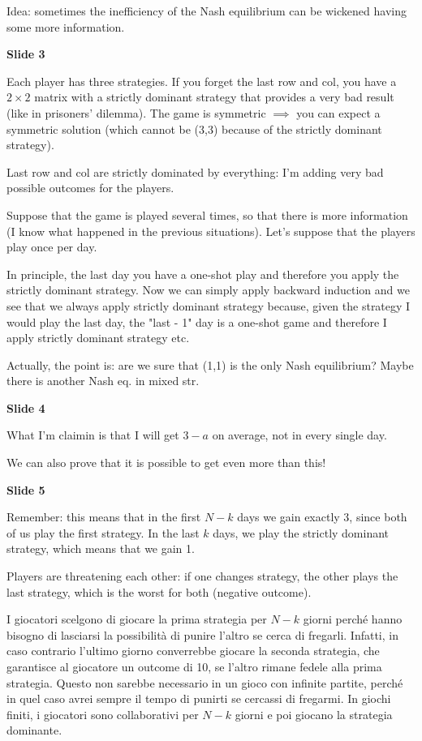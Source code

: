 \documentclass[pt11,a4paper,twoside,reqno,openright]{paper}
\begin{document}

\bigskip
\noindent Idea: sometimes the inefficiency of the Nash equilibrium can be 
wickened having some more information.

\bigskip
\noindent \textbf{Slide 3}

\noindent Each player has three strategies. If you forget the last row and col, 
you have a $2 \times 2$ matrix with a strictly dominant strategy that 
provides a very bad result (like in prisoners' dilemma). The game is symmetric 
$\implies$ you can expect a symmetric solution (which cannot be (3,3) because 
of the strictly dominant strategy).

\noindent Last row and col are strictly dominated by everything: I'm adding 
very bad possible outcomes for the players.

\noindent Suppose that the game is played several times, so that there is more 
information (I know what happened in the previous situations). Let's suppose 
that the players play once per day.

\noindent In principle, the last day you have a one-shot play and therefore 
you apply the strictly dominant strategy. Now we can simply apply backward 
induction and we see that we always apply strictly dominant strategy because, 
given the strategy I would play the last day, the "last - 1" day is a 
one-shot game and therefore I apply strictly dominant strategy etc.

\noindent Actually, the point is: are we sure that (1,1) is the only Nash 
equilibrium? Maybe there is another Nash eq. in mixed str.

\bigskip
\noindent \textbf{Slide 4}

\noindent What I'm claimin is that I will get $3-a$ on average, not in every 
single day. 

\noindent We can also prove that it is possible to get even more than this!

\bigskip
\noindent \textbf{Slide 5}

\noindent Remember: this means that in the first $N-k$ days we gain exactly 
3, since both of us play the first strategy. In the last $k$ days, we play the 
strictly dominant strategy, which means that we gain 1.

\noindent Players are threatening each other: if one changes strategy, the other 
plays the last strategy, which is the worst for both (negative outcome).

\noindent I giocatori scelgono di giocare la prima strategia per $N-k$ giorni 
perché hanno bisogno di lasciarsi la possibilità di punire l'altro se cerca di 
fregarli. Infatti, in caso contrario l'ultimo giorno converrebbe giocare la 
seconda strategia, che garantisce al giocatore un outcome di 10, se l'altro 
rimane fedele alla prima strategia. Questo non sarebbe necessario in un gioco 
con infinite partite, perché in quel caso avrei sempre il tempo di punirti se 
cercassi di fregarmi. In giochi finiti, i giocatori sono collaborativi per 
$N-k$ giorni e poi giocano la strategia dominante.
\end{document}
